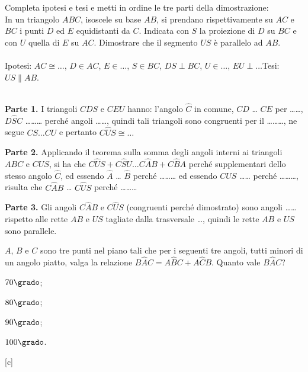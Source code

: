 \begin{esercizio}
\label{ese:3.20}
Completa ipotesi e tesi e metti in ordine le tre parti della 
dimostrazione:\\
In un triangolo $ABC$, isoscele su base $AB$, si prendano 
rispettivamente su $AC$ e $BC$ i punti $D$ ed $E$ equidistanti da 
$C$. Indicata con $S$ la proiezione di $D$ su $BC$ e con $U$ quella di 
$E$ su $AC$. Dimostrare che il segmento $US$ è parallelo ad $AB$.\\
~\\
\noindent Ipotesi: $AC\cong \ldots$, $D\in AC$, $E\in \ldots$, $S\in 
BC$, $DS\perp BC$, $U\in \ldots$, $EU\perp \ldots$\hfill Tesi: 
$US\parallel AB$.\\
~\\
\noindent\begin{minipage}{.75\textwidth}
\textbf{Parte 1.} I triangoli $CDS$ e $CEU$  hanno: l'angolo 
$\widehat{C}$ in comune, $CD$ \ldots{} $CE$ per \ldots\ldots{}, 
$D\widehat{S}C$ \ldots\ldots\ldots{} perché angoli \ldots\ldots{}, 
quindi tali triangoli sono congruenti per il \ldots\ldots\ldots{}, ne 
segue $CS \ldots CU$ e pertanto $C\widehat{U}S\cong \ldots$\par

\textbf{Parte 2.} Applicando il teorema sulla somma degli angoli 
interni ai triangoli $ABC$ e $CUS$, si ha che $C\widehat{U}S + 
C\widehat{S}U \ldots{} C\widehat{A}B + C\widehat{B}A$ perché 
supplementari dello stesso angolo $\widehat{C}$, ed essendo 
$\widehat{A}$ \dots{} $\widehat{B}$ perché \ldots\ldots\ldots{} ed 
essendo $C\widehat{U}S$ \ldots\ldots{} perché \ldots\ldots\ldots{}, 
risulta che $C\widehat{A}B$ \ldots{} $C\widehat{U}S$ perché 
\ldots\ldots\ldots{}\par

\textbf{Parte 3.} Gli angoli $C\widehat{A}B$ e $C\widehat{U}S$ 
(congruenti perché dimostrato) sono angoli \ldots\ldots rispetto alle 
rette $AB$ e $US$ tagliate dalla trasversale \ldots, quindi le rette 
$AB$ e $US$ sono parallele.
\end{minipage}\hfil
\begin{minipage}{.25\textwidth}
\centering
\end{minipage}
\end{esercizio}

\begin{esercizio}  %
\label{ese:3.21}
$A$, $B$ e $C$ sono tre punti nel piano tali che per i seguenti tre 
angoli, tutti minori di un angolo piatto, valga la relazione 
$B\widehat{A}C=A\widehat{B}C+A\widehat{C}B$. Quanto vale 
$B\widehat{A}C$?
\begin{multicols}{4}
\begin{enumeratea}
\item $70\grado$;
\item $80\grado$;
\item $90\grado$;
\item $100\grado$.
\end{enumeratea}
\end{multicols}
\hfill[c]
\end{esercizio}

